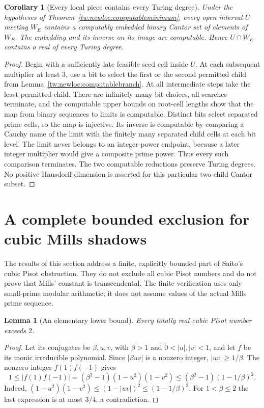 \documentclass[11pt,a4paper]{article}
\newtheorem{lemma}[theorem]{Lemma}
\newtheorem{corollary}[theorem]{Corollary}
\theoremstyle{definition}
\theoremstyle{remark}
\numberwithin{equation}{section}
\begin{document}
\begin{corollary}[Every local piece contains every Turing degree]
\label{tw:newloc:degrees}
Under the hypotheses of Theorem~\ref{tw:newloc:computableminimum}, every
open interval $U$ meeting $W_E$ contains a computably embedded binary
Cantor set of elements of $W_E$. The embedding and its inverse on its
image are computable. Hence $U\cap W_E$ contains a real of every Turing
degree.
\end{corollary}

\begin{proof}
Begin with a sufficiently late feasible seed cell inside $U$. At each
subsequent multiplier at least $3$, use a bit to select the first or the
second permitted child from Lemma~\ref{tw:newloc:computablebranch}. At all
intermediate steps take the least permitted child. There are infinitely
many bit choices, all searches terminate, and the computable upper bounds
on root-cell lengths show that the map from binary sequences to limits is
computable. Distinct bits select separated prime cells, so the map is
injective. Its inverse is computable by comparing a Cauchy name of the
limit with the finitely many separated child cells at each bit level.
The limit never belongs to an integer-power endpoint, because a later
integer multiplier would give a composite prime power. Thus every such
comparison terminates. The two computable reductions preserve Turing
degrees. No positive Hausdorff dimension is asserted for this particular
two-child Cantor subset.
\end{proof}


\section{A complete bounded exclusion for cubic Mills shadows}\label{tw:sec:cubic-new}

The results of this section address a finite, explicitly bounded part of
Saito's cubic Pisot obstruction. They do not exclude all cubic Pisot
numbers and do not prove that Mills' constant is transcendental. The
finite verification uses only small-prime modular arithmetic; it does
not assume values of the actual Mills prime sequence.

\begin{lemma}[An elementary lower bound]\label{tw:lem:cubic-below-two}
Every totally real cubic Pisot number exceeds $2$.
\end{lemma}
\begin{proof}
Let its conjugates be $\beta,u,v$, with $\beta>1$ and
$0<|u|,|v|<1$, and let $f$ be its monic irreducible polynomial.
Since $|\beta uv|$ is a nonzero integer, $|uv|\ge1/\beta$.
The nonzero integer $f(1)f(-1)$ gives
\[
 1\le |f(1)f(-1)|
   =(\beta^2-1)(1-u^2)(1-v^2)
   \le (\beta^2-1)(1-1/\beta)^2.
\]
Indeed, $(1-u^2)(1-v^2)\le(1-|uv|)^2\le(1-1/\beta)^2$.
For $1<\beta\le2$ the last expression is at most $3/4$, a
contradiction.
\end{proof}
\end{document}
